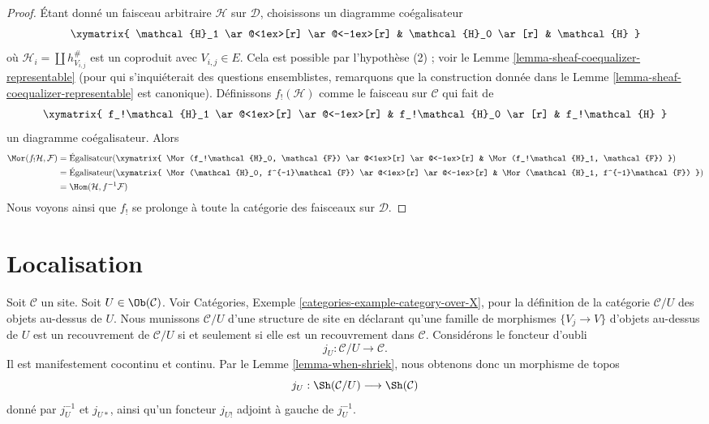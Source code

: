 \begin{proof}
\medskip\noindent
Étant donné un faisceau arbitraire $\mathcal{H}$ sur $\mathcal{D}$,
choisissons un diagramme coégalisateur
$$
\xymatrix{
\mathcal{H}_1 \ar@<1ex>[r] \ar@<-1ex>[r] &
\mathcal{H}_0 \ar[r] &
\mathcal{H}
}
$$
où $\mathcal{H}_i = \coprod h_{V_{i, j}}^\#$
est un coproduit avec $V_{i, j} \in E$.
Cela est possible par l’hypothèse (2) ; voir le
Lemme \ref{lemma-sheaf-coequalizer-representable}
(pour qui s’inquiéterait des questions ensemblistes, remarquons que
la construction donnée dans le
Lemme \ref{lemma-sheaf-coequalizer-representable} est canonique).
Définissons $f_!(\mathcal{H})$ comme le faisceau sur $\mathcal{C}$ qui fait de
$$
\xymatrix{
f_!\mathcal{H}_1 \ar@<1ex>[r] \ar@<-1ex>[r] &
f_!\mathcal{H}_0 \ar[r] &
f_!\mathcal{H}
}
$$
un diagramme coégalisateur. Alors
\begin{align*}
\Mor(f_!\mathcal{H}, \mathcal{F})
& =
\text{Égalisateur}(
\xymatrix{
\Mor(f_!\mathcal{H}_0, \mathcal{F}) \ar@<1ex>[r] \ar@<-1ex>[r] &
\Mor(f_!\mathcal{H}_1, \mathcal{F})
}
) \\
& =
\text{Égalisateur}(
\xymatrix{
\Mor(\mathcal{H}_0, f^{-1}\mathcal{F}) \ar@<1ex>[r] \ar@<-1ex>[r] &
\Mor(\mathcal{H}_1, f^{-1}\mathcal{F})
}
) \\
& =
\Hom(\mathcal{H}, f^{-1}\mathcal{F})
\end{align*}
Nous voyons ainsi que $f_!$ se prolonge à toute la catégorie des faisceaux
sur $\mathcal{D}$.
\end{proof}








\section{Localisation}
\label{section-localize}

\noindent
Soit $\mathcal{C}$ un site.
Soit $U \in \Ob(\mathcal{C})$.
Voir Catégories, Exemple \ref{categories-example-category-over-X},
pour la définition de la catégorie $\mathcal{C}/U$ des objets au-dessus de $U$.
Nous munissons $\mathcal{C}/U$ d’une structure de site en déclarant qu’une
famille de morphismes $\{V_j \to V\}$ d’objets au-dessus de $U$ est un
recouvrement de $\mathcal{C}/U$ si et seulement si elle est un recouvrement
dans $\mathcal{C}$. Considérons le foncteur d’oubli
$$
j_U : \mathcal{C}/U \longrightarrow \mathcal{C}.
$$
Il est manifestement cocontinu et continu. Par le
Lemme \ref{lemma-when-shriek}, nous obtenons donc un morphisme de topos
$$
j_U : \Sh(\mathcal{C}/U) \longrightarrow \Sh(\mathcal{C})
$$
donné par $j_U^{-1}$ et $j_{U*}$, ainsi qu’un foncteur $j_{U!}$
adjoint à gauche de $j_U^{-1}$.

